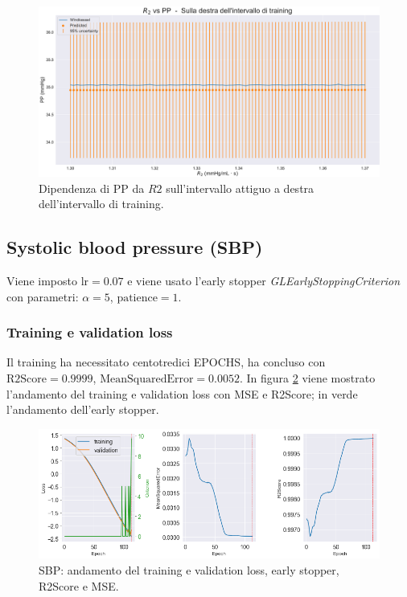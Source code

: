 \begin{figure}
    \centering
    \includegraphics[width=1\textwidth]{images/Training (risultati)/PP/PP - R2 - dx.pdf}
    \caption{Dipendenza di PP da $R2$ sull'intervallo attiguo a destra dell'intervallo di training.}
    \label{PP - R2 - dx}
\end{figure}







\newpage

\subsection{Systolic blood pressure (SBP)}
Viene imposto $\text{lr}=0.07$ e viene usato l'early stopper \textit{GLEarlyStoppingCriterion} con parametri: $\alpha = 5$, $\text{patience}=1$.

\subsubsection{Training e validation loss}
Il training ha necessitato centotredici EPOCHS, ha concluso con $\text{R2Score}=0.9999$, $\text{MeanSquaredError}=0.0052$. In figura \ref{SBP - loss} viene mostrato l'andamento del training e validation loss con MSE e R2Score; in verde l'andamento dell'early stopper.
\begin{figure}[h]
    \centering
    \includegraphics[width=1\textwidth]{images/Training (risultati)/SBP/SBP - loss.png}
    \caption{SBP: andamento del training e validation loss, early stopper, R2Score e MSE.}
    \label{SBP - loss}
\end{figure}

